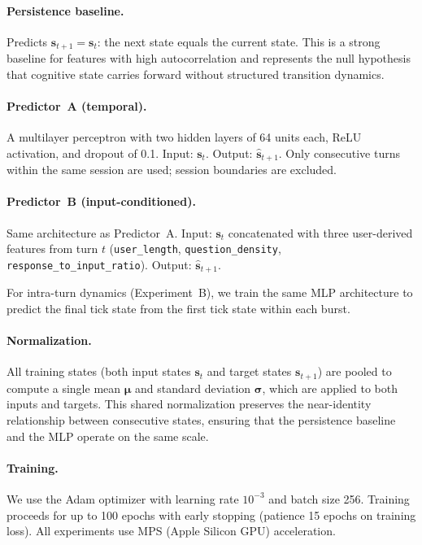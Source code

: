\documentclass[twoside,11pt]{article}
\begin{document}
\paragraph{Persistence baseline.} Predicts $\mathbf{s}_{t+1} = \mathbf{s}_t$:
the next state equals the current state. This is a strong baseline for features
with high autocorrelation and represents the null hypothesis that cognitive
state carries forward without structured transition dynamics.

\paragraph{Predictor~A (temporal).} A multilayer perceptron with two hidden
layers of 64 units each, ReLU activation, and dropout of 0.1. Input:
$\mathbf{s}_t$. Output: $\hat{\mathbf{s}}_{t+1}$. Only consecutive turns
within the same session are used; session boundaries are excluded.

\paragraph{Predictor~B (input-conditioned).} Same architecture as Predictor~A.
Input: $\mathbf{s}_t$ concatenated with three user-derived features from turn
$t$ (\texttt{user\_length}, \texttt{question\_density},
\texttt{response\_to\_input\_ratio}). Output: $\hat{\mathbf{s}}_{t+1}$.

For intra-turn dynamics (Experiment~B), we train the same MLP architecture to
predict the final tick state from the first tick state within each burst.

\paragraph{Normalization.} All training states (both input states $\mathbf{s}_t$
and target states $\mathbf{s}_{t+1}$) are pooled to compute a single mean
$\boldsymbol{\mu}$ and standard deviation $\boldsymbol{\sigma}$, which are
applied to both inputs and targets. This shared normalization preserves the
near-identity relationship between consecutive states, ensuring that the
persistence baseline and the MLP operate on the same scale.

\paragraph{Training.} We use the Adam optimizer \citep{kingma2015adam} with
learning rate $10^{-3}$ and batch size 256. Training proceeds for up to 100
epochs with early stopping (patience 15 epochs on training loss). All
experiments use MPS (Apple Silicon GPU) acceleration.
\end{document}
